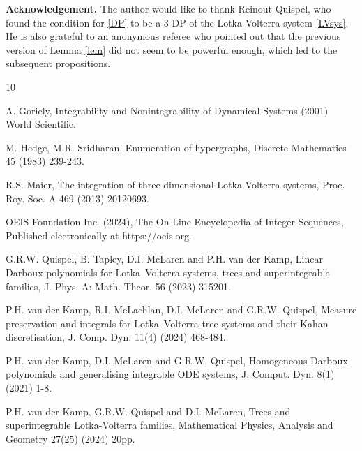 \documentclass{article}
\begin{document}
\noindent
{\bf Acknowledgement.} The author would like to thank Reinout Quispel, who found the condition for \eqref{DP} to be a 3-DP of the Lotka-Volterra system \eqref{LVsys}. He is also grateful to an anonymous referee who pointed out that the previous version of Lemma \ref{lem} did not seem to be powerful enough, which led to the subsequent propositions.
\begin{thebibliography}{10}

A. Goriely, Integrability and Nonintegrability of Dynamical Systems (2001) World Scientific.

M. Hedge, M.R. Sridharan, Enumeration of hypergraphs, Discrete Mathematics 45 (1983) 239-243.

R.S. Maier, The integration of three-dimensional Lotka-Volterra systems, Proc. Roy. Soc. A
469 (2013) 20120693.

OEIS Foundation Inc. (2024), The On-Line Encyclopedia of Integer Sequences, Published electronically at https://oeis.org.

G.R.W. Quispel, B. Tapley, D.I. McLaren and P.H. van der Kamp, Linear Darboux polynomials for Lotka--Volterra systems, trees and superintegrable families, J. Phys. A: Math. Theor. 56 (2023) 315201.

P.H. van der Kamp, R.I. McLachlan, D.I. McLaren and G.R.W. Quispel, Measure preservation and integrals for Lotka--Volterra tree-systems and their Kahan discretisation, J. Comp. Dyn. 11(4) (2024) 468-484.

P.H. van der Kamp, D.I. McLaren and G.R.W. Quispel, Homogeneous Darboux polynomials and
generalising integrable ODE systems, J. Comput. Dyn. 8(1) (2021) 1-8.

P.H. van der Kamp, G.R.W. Quispel and D.I. McLaren, Trees and superintegrable Lotka-Volterra families, Mathematical Physics, Analysis and Geometry 27(25) (2024) 20pp. %
\end{thebibliography}
\end{document}
